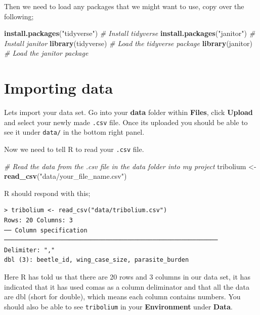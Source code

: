 \documentclass[
]{book}
\newenvironment{Shaded}{\begin{snugshade}}{\end{snugshade}}
\newcommand{\CommentTok}[1]{\textcolor[rgb]{0.56,0.35,0.01}{\textit{#1}}}
\newcommand{\FunctionTok}[1]{\textcolor[rgb]{0.13,0.29,0.53}{\textbf{#1}}}
\newcommand{\NormalTok}[1]{#1}
\newcommand{\OtherTok}[1]{\textcolor[rgb]{0.56,0.35,0.01}{#1}}
\newcommand{\StringTok}[1]{\textcolor[rgb]{0.31,0.60,0.02}{#1}}
\begin{document}
Then we need to load any packages that we might want to use, copy over the following;

\begin{Shaded}
\begin{Highlighting}[]
\FunctionTok{install.packages}\NormalTok{(}\StringTok{"tidyverse"}\NormalTok{) }\CommentTok{\# Install tidyverse}
\FunctionTok{install.packages}\NormalTok{(}\StringTok{"janitor"}\NormalTok{) }\CommentTok{\# Install janitor}
\FunctionTok{library}\NormalTok{(tidyverse) }\CommentTok{\# Load the tidyverse package}
\FunctionTok{library}\NormalTok{(janitor) }\CommentTok{\# Load the janitor package}
\end{Highlighting}
\end{Shaded}

\section{Importing data}\label{importing}

Lets import your data set. Go into your \textbf{data} folder within \textbf{Files}, click \textbf{Upload} and select your newly made \texttt{.csv} file. Once its uploaded you should be able to see it under \texttt{data/} in the bottom right panel.

Now we need to tell R to read your \texttt{.csv} file.

\begin{Shaded}
\begin{Highlighting}[]
\CommentTok{\# Read the data from the .csv file in the data folder into my project}
\NormalTok{tribolium }\OtherTok{\textless{}{-}} \FunctionTok{read\_csv}\NormalTok{(}\StringTok{"data/your\_file\_name.csv"}\NormalTok{) }
\end{Highlighting}
\end{Shaded}

R should respond with this;

\begin{verbatim}
> tribolium <- read_csv("data/tribolium.csv")
Rows: 20 Columns: 3                                                              
── Column specification ───────────────────────────────────────────────────────────
Delimiter: ","
dbl (3): beetle_id, wing_case_size, parasite_burden
\end{verbatim}

Here R has told us that there are 20 rows and 3 columns in our data set, it has indicated that it has used comas as a column deliminator and that all the data are dbl (short for double), which means each column contains numbers. You should also be able to see \texttt{tribolium} in your \textbf{Environment} under \textbf{Data}.
\end{document}
